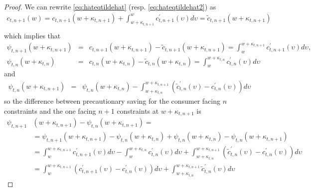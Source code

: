 \documentclass[titlepage]{\econtex}
\begin{document}
\begin{proof}
    We can rewrite \eqref{eq:hateqtildehat} (resp. \eqref{eq:hateqtildehat2}) as
    \begin{eqnarray*}
      c_{t,n+1}(w) = c_{t,n+1}({w}+\kappa_{t,n+1})+\int_{{w}+\kappa_{t,n+1}}^{{w}} c_{t,n+1}^{\prime}(\upsilon) d\upsilon  = \tilde{c}_{t,n+1}({w}+\kappa_{t,n+1})
      \\ %
    \end{eqnarray*}
    which implies that
    \begin{eqnarray*}
      \psi_{t,n+1}({w}+\kappa_{t,n+1}) & = & 
                                             c_{t,n+1}({w}+\kappa_{t,n+1})-\tilde{c}_{t,n+1}({w}+\kappa_{t,n+1}) = \int^{{w}+\kappa_{t,n+1}}_{{w}} c_{t,n+1}^{\prime}(\upsilon) d\upsilon,
      \\ %
      \psi_{t,n}({w}+\kappa_{t,n}) & = &  c_{t,n}({w}+\kappa_{t,n})-\tilde{c}_{t,n}({w}+\kappa_{t,n}) = \int^{{w}+\kappa_{t,n}}_{{w}} c_{t,n}^{\prime}(\upsilon) d\upsilon 
    \end{eqnarray*}
    and 
    \begin{eqnarray}
      \psi_{t,n}({w}+\kappa_{t,n+1}) & = & 
                                           \psi_{t,n}({w}+\kappa_{t,n}) - \int^{{w}+\kappa_{t,n+1}}_{{w}+\kappa_{t,n}} (\tilde{c}_{t,n}^{\prime}(\upsilon)-c_{t,n}^{\prime}(\upsilon)) d\upsilon \nonumber
    \end{eqnarray}
    so the difference between precautionary saving for the consumer facing $n$ constraints and the one facing $n+1$ constraints at ${w}+\kappa_{t,n+1}$ is 
    \begin{align}
      \psi_{t,n+1}&({w}+\kappa_{t,n+1}) - \psi_{t,n}({w}+\kappa_{t,n+1}) = \nonumber\\ 
                  &= \psi_{t,n+1}({w}+\kappa_{t,n+1}) - \psi_{t,n}({w}+\kappa_{t,n}) + \psi_{t,n}({w}+\kappa_{t,n})- \psi_{t,n}({w}+\kappa_{t,n+1}) \nonumber
      \\ &=\int_{{w}}^{{w}+\kappa_{t,n+1}} c_{t,n+1}^{\prime}(\upsilon)d\upsilon - \int^{{w}+\kappa_{t,n}}_{{w}} c_{t,n}^{\prime}(\upsilon) d\upsilon + \int^{{w}+\kappa_{t,n+1}}_{{w}+\kappa_{t,n}} (\tilde{c}_{t,n}^{\prime}(\upsilon)-c_{t,n}^{\prime}(\upsilon)) d\upsilon \nonumber\\
                  &= \int_{{w}}^{{w}+\kappa_{t,n+1}}
                    (c_{t,n+1}^{\prime}(\upsilon)-c_{t,n}^{\prime}(\upsilon))d\upsilon +\int^{{w}+\kappa_{t,n+1}}_{{w}+\kappa_{t,n}}
                    \tilde{c}_{t,n}^{\prime}(\upsilon) d\upsilon \label{eq:psidiffint}
    \end{align}



\end{proof}
\end{document}
